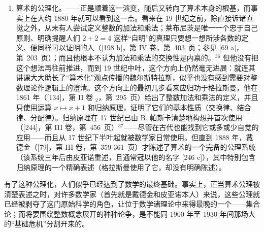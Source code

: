 \begin{enumerate}
\def\labelenumi{\Alph{enumi})}
\setcounter{enumi}{3}
\tightlist
\item
  算术的公理化。——正是顺着这一演变，随后又转向了算术本身的根基，而事实上在大约 1880 年就可以看到这一点。看来在 19 世纪之前，除直接诉诸直觉之外，从未有人尝试定义整数的加法和乘法；莱布尼茨是唯一一个忠于自己原则、明确提醒人们 \(2 + 2 = 4\) 这样“自明”的真理只要想一想所涉各数的定义、便同样可以证明的人（{[}198 b{]}，第 IV 卷，第~403~页；参见 {[}69 a{]}，第~203~页）；而且他根本不认为加法和乘法的交换性是内禀的。\(^{36}\) 但他没有把这个想法再往前推进，而到 19 世纪中叶，这个方向上仍然毫无进展：就连其讲课大大助长了“算术化”观点传播的魏尔斯特拉斯，似乎也没有感到需要对整数理论作逻辑上的澄清。这个方向上的最初几步看来应归功于格拉斯曼，他在 1861 年（{[}134{]}，第 II 卷 \(_{2}\)，第~295~页）给出了整数加法和乘法的定义，并且只使用运算 \(x \mapsto x + 1\) 和归纳原理，证明了它们的基本性质（交换律、结合律、分配律）。归纳原理在 17 世纪已由 B. 帕斯卡清楚地构想并首次使用（{[}244{]}，第 III 卷，第~456~页）\(^{37}\)——尽管在古代也能找到它或多或少自觉的应用——而且从 17 世纪下半叶起就被数学家日常使用。但直到 1888 年，戴德金（{[}79{]}，第 III 卷，第~359-361~页）才陈述了算术的一个完备的公理系统（该系统三年后由皮亚诺重述，且通常冠以他的名字 {[}246 c{]}），其中特别包含归纳原理的一个精确表述（格拉斯曼使用了它，却没有明确陈述）。
\end{enumerate}

有了这种公理化，人们似乎已经达到了数学的最终基础。事实上，正当算术公理被清楚表述之时，对许多数学家（首先就是戴德金和皮亚诺本人）来说，这些公理就已经被剥夺了这门原始科学的角色，让位于数学诸理论中来得最晚的一个——集合论；而将要围绕整数概念展开的种种论争，是不能同 1900 年至 1930 年间那场大的“基础危机”分割开来的。
